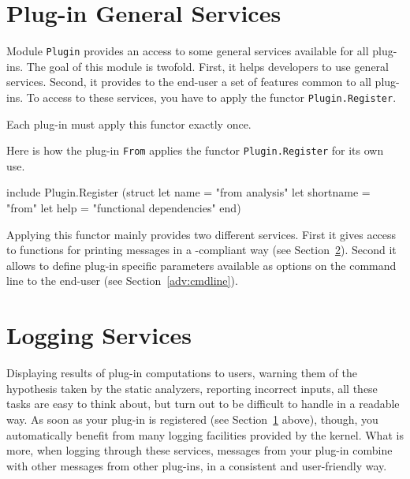 
\section{Plug-in General Services}\label{adv:plugin-services}

Module \texttt{Plugin} provides an access to some general
services available for all plug-ins. The goal of this module is twofold. First,
it helps developers to use general \framac services. Second, it provides to the
end-user a set of features common to all plug-ins. To access to these services,
you have to apply the functor
\texttt{Plugin.Register}.

\begin{important}
Each plug-in must apply this functor exactly once.
\end{important}

\begin{example}
Here is how the plug-in \texttt{From} applies the functor
\texttt{Plugin.Register} for its own use.
\begin{ocamlcode}
include Plugin.Register
  (struct
     let name = "from analysis"
     let shortname = "from"
     let help = "functional dependencies"
   end)
\end{ocamlcode}
\end{example}

Applying this functor mainly provides two different services. First it gives
access to functions for printing messages in a \framac-compliant way (see
Section~\ref{adv:log}). Second it allows to define plug-in specific parameters
available as options on the \framac command line to the end-user (see
Section~\ref{adv:cmdline}).


\section{Logging Services}\label{adv:log}

Displaying results of plug-in computations to users, warning them of the
hypothesis taken by the static analyzers, reporting incorrect inputs, all
these tasks are easy to think about, but turn out to be difficult to
handle in a readable way. As soon as your plug-in is registered (see
Section~\ref{adv:plugin-services} above), though, you automatically
benefit from many logging facilities provided by the kernel. What is more,
when logging through these services, messages from your plug-in
combine with other messages from other plug-ins, in a consistent
and user-friendly way.

